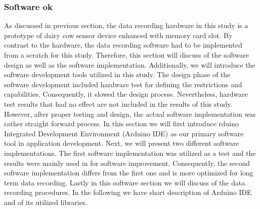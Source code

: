 \documentclass[english,12pt,a4paper,pdftex,elec,utf8]{aaltothesis}
\begin{document}


\subsubsection{Software ok} \label{softwaresection}

As discussed in previous section, the data recording hardware in this study is a prototype of dairy cow sensor device enhanced with memory card slot. By contrast to the hardware, the data recording software had to be implemented from a scratch for this study. Therefore, this section will discuss of the software design as well as the software implementation.  Additionally, we will introduce the software development tools utilized in this study. The design phase of the software development included hardware test for defining the restrictions and capabilities. Consequently, it slowed the design process. Nevertheless, hardware test results that had no effect are not included in the results of this study. However, after proper testing and design, the actual software implementation was rather straight forward process. In this section we will first introduce rduino Integrated Development Environment (Arduino IDE) \cite{arduinoide} as our primary software tool in application development. Next, we will present two different software implementations. The first software implementation was utilized as a test and the results were mainly used in for software improvement. Consequently, the second software implementation differs from the first one and is more optimized for long term data recording. Lastly in this software section we will discuss of the data recording procedures. In the following we have short description of Arduino IDE and of its utilized libraries.
\end{document}
